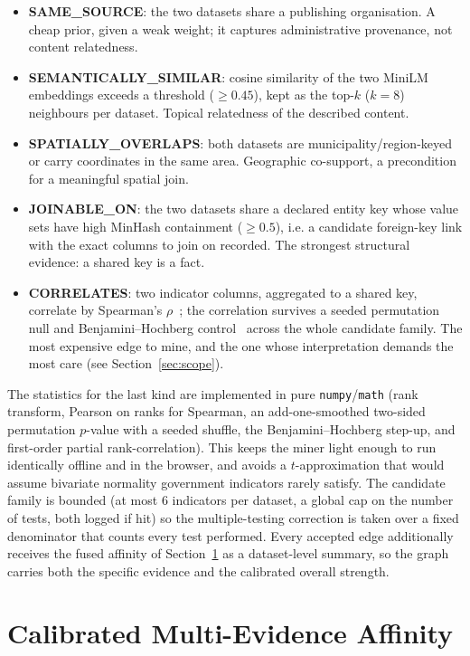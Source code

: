 \documentclass[journal]{IEEEtran}
\begin{document}
\begin{itemize}
\item \textbf{SAME\_SOURCE}: the two datasets share a publishing organisation. A cheap prior, given a weak weight;
it captures administrative provenance, not content relatedness.
\item \textbf{SEMANTICALLY\_SIMILAR}: cosine similarity of the two MiniLM embeddings exceeds a threshold
($\ge 0.45$), kept as the top-$k$ ($k=8$) neighbours per dataset. Topical relatedness of the described content.
\item \textbf{SPATIALLY\_OVERLAPS}: both datasets are municipality\slash region-keyed or carry coordinates in the same
area. Geographic co-support, a precondition for a meaningful spatial join.
\item \textbf{JOINABLE\_ON}: the two datasets share a declared entity key whose value sets have high MinHash
containment ($\ge 0.5$), i.e. a candidate foreign-key link with the exact columns to join on recorded. The
strongest structural evidence: a shared key is a fact.
\item \textbf{CORRELATES}: two indicator columns, aggregated to a shared key, correlate by Spearman's
$\rho$~\cite{spearman}; the correlation survives a seeded permutation null and Benjamini--Hochberg
control~\cite{bh} across the whole candidate family. The most expensive edge to mine, and the one whose
interpretation demands the most care (see Section~\ref{sec:scope}).
\end{itemize}

The statistics for the last kind are implemented in pure \texttt{numpy}/\texttt{math} (rank transform, Pearson on
ranks for Spearman, an add-one-smoothed two-sided permutation $p$-value with a seeded shuffle, the
Benjamini--Hochberg step-up, and first-order partial rank-correlation). This keeps the miner light enough to run
identically offline and in the browser, and avoids a $t$-approximation that would assume bivariate normality
government indicators rarely satisfy. The candidate family is bounded (at most $6$ indicators per dataset, a
global cap on the number of tests, both logged if hit) so the multiple-testing correction is taken over a fixed
denominator that counts every test performed. Every accepted edge additionally receives the fused affinity of Section~\ref{sec:affinity} as
a dataset-level summary, so the graph carries both the specific evidence and the calibrated overall strength.

\section{Calibrated Multi-Evidence Affinity}\label{sec:affinity}
\end{document}
